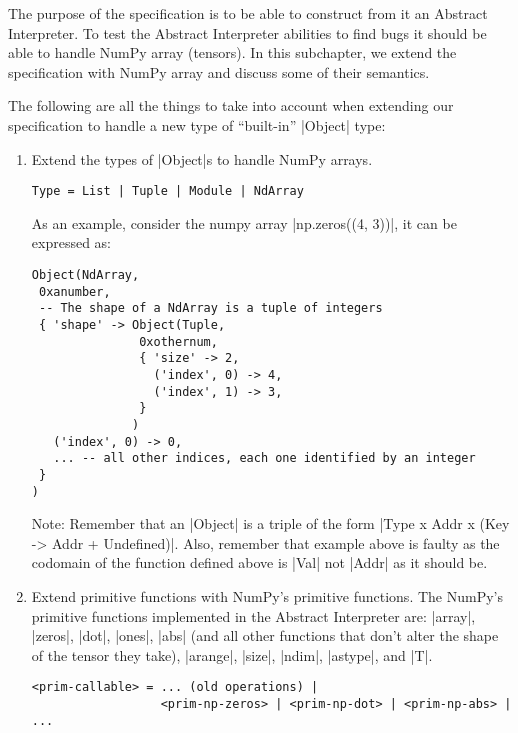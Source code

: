 The purpose of the specification is to be able to construct from it an
Abstract Interpreter. To test the Abstract Interpreter abilities to find
bugs it should be able to handle NumPy array (tensors). In this
subchapter, we extend the specification with NumPy array and discuss some
of their semantics.

The following are all the things to take into account when extending our
specification to handle a new type of \enquote{built-in} \pycode|Object|
type:

\begin{enumerate}
\def\labelenumi{\arabic{enumi}.}
\item
  Extend the types of \pycode|Object|s to handle NumPy arrays.

\begin{verbatim}
Type = List | Tuple | Module | NdArray
\end{verbatim}

  As an example, consider the numpy array \pycode|np.zeros((4, 3))|, it
  can be expressed as:

\begin{verbatim}
Object(NdArray,
 0xanumber,
 -- The shape of a NdArray is a tuple of integers
 { 'shape' -> Object(Tuple,
               0xothernum,
               { 'size' -> 2,
                 ('index', 0) -> 4,
                 ('index', 1) -> 3,
               }
              )
   ('index', 0) -> 0,
   ... -- all other indices, each one identified by an integer
 }
)
\end{verbatim}

  Note: Remember that an \pycode|Object| is a triple of the form
  \pycode|Type x Addr x (Key -> Addr + Undefined)|.
  Also, remember that example above is faulty as the codomain of the
  function defined above is \pycode|Val| not \pycode|Addr| as it should
  be.
\item
  Extend primitive functions with NumPy's primitive functions. The
  NumPy's primitive functions implemented in the Abstract Interpreter
  are: \pycode|array|, \pycode|zeros|, \pycode|dot|, \pycode|ones|,
  \pycode|abs| (and all other functions that don't alter the shape of
  the tensor they take), \pycode|arange|, \pycode|size|, \pycode|ndim|,
  \pycode|astype|, and \pycode|T|.

\begin{verbatim}
<prim-callable> = ... (old operations) |
                  <prim-np-zeros> | <prim-np-dot> | <prim-np-abs> | ...
\end{verbatim}


\end{enumerate}

